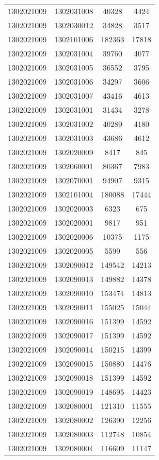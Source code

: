 \begin{longtable}{llcc}
1302021009 & 1302031008 & 40328 & 4424\\
1302021009 & 1302030012 & 34828 & 3517\\
1302021009 & 1302101006 & 182363 & 17818\\
1302021009 & 1302031004 & 39760 & 4077\\
1302021009 & 1302031005 & 36552 & 3795\\
1302021009 & 1302031006 & 34297 & 3606\\
1302021009 & 1302031007 & 43416 & 4613\\
1302021009 & 1302031001 & 31434 & 3278\\
1302021009 & 1302031002 & 40289 & 4180\\
1302021009 & 1302031003 & 43686 & 4612\\
1302021009 & 1302020009 & 8417 & 845\\
1302021009 & 1302060001 & 80367 & 7983\\
1302021009 & 1302070001 & 94907 & 9315\\
1302021009 & 1302101004 & 180088 & 17444\\
1302021009 & 1302020003 & 6323 & 675\\
1302021009 & 1302020001 & 9817 & 951\\
1302021009 & 1302020006 & 10375 & 1175\\
1302021009 & 1302020005 & 5599 & 556\\
1302021009 & 1302090012 & 149542 & 14213\\
1302021009 & 1302090013 & 149882 & 14378\\
1302021009 & 1302090010 & 153474 & 14813\\
1302021009 & 1302090011 & 155025 & 15044\\
1302021009 & 1302090016 & 151399 & 14592\\
1302021009 & 1302090017 & 151399 & 14592\\
1302021009 & 1302090014 & 150215 & 14399\\
1302021009 & 1302090015 & 150880 & 14476\\
1302021009 & 1302090018 & 151399 & 14592\\
1302021009 & 1302090019 & 148695 & 14423\\
1302021009 & 1302080001 & 121310 & 11555\\
1302021009 & 1302080002 & 126390 & 12256\\
1302021009 & 1302080003 & 112748 & 10854\\
1302021009 & 1302080004 & 116609 & 11147\\

\end{longtable}
